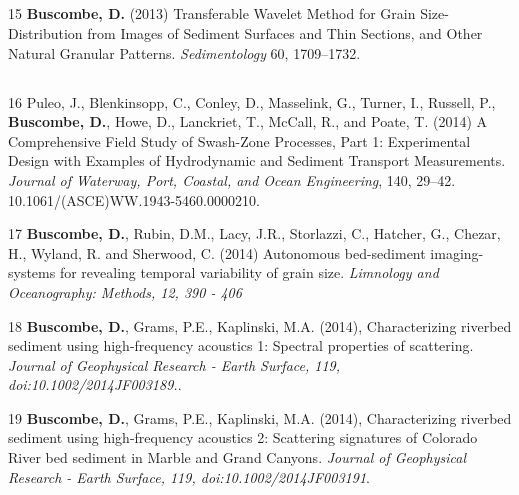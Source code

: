 \documentclass[margin,line]{resume}
\begin{document}
\begin{resume}
\begin{footnotesize}
	\subsection{}
	\begin{list1}
        \item[15] {\bf Buscombe, D.} (2013) Transferable Wavelet Method for Grain Size-Distribution from Images of Sediment Surfaces and Thin Sections, and Other Natural Granular Patterns. {\sl Sedimentology} 60, 1709--1732. 

	\end{list1}

	\subsection{}
	\begin{list1}
        \item[16] Puleo, J., Blenkinsopp, C., Conley, D., Masselink, G., Turner, I., Russell, P., {\bf Buscombe, D.}, Howe, D., Lanckriet, T., McCall, R., and Poate, T. (2014) A Comprehensive Field Study of Swash-Zone Processes, Part 1: Experimental Design with Examples of Hydrodynamic and Sediment Transport Measurements. {\sl Journal of Waterway, Port, Coastal, and Ocean Engineering}, 140, 29–42. 10.1061/(ASCE)WW.1943-5460.0000210.\\

	\item[17]  {\bf Buscombe, D.}, Rubin, D.M., Lacy, J.R., Storlazzi, C., Hatcher, G., Chezar, H., Wyland, R. and Sherwood, C. (2014) Autonomous bed-sediment imaging-systems for revealing temporal variability of grain size. {\sl Limnology and Oceanography: Methods, 12, 390 - 406}

	\item[18] {\bf Buscombe, D.}, Grams, P.E., Kaplinski, M.A. (2014), Characterizing riverbed sediment using high-frequency acoustics 1: Spectral properties of scattering. {\sl Journal of Geophysical Research - Earth Surface, 119, doi:10.1002/2014JF003189.}.\\

	\item[19] {\bf Buscombe, D.}, Grams, P.E., Kaplinski, M.A. (2014), Characterizing riverbed sediment using high-frequency acoustics 2: Scattering signatures of Colorado River bed sediment in Marble and Grand Canyons. {\sl Journal of Geophysical Research - Earth Surface, 119, doi:10.1002/2014JF003191}.

	\end{list1}
	

\end{footnotesize}
\end{resume}
\end{document}
